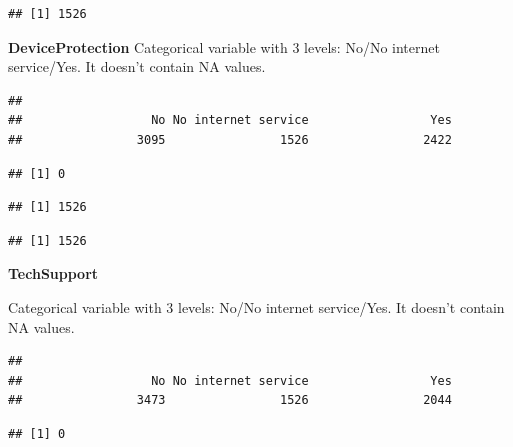 \documentclass[
  twoside]{article}
\newenvironment{Shaded}{\begin{snugshade}}{\end{snugshade}}
\newcommand{\CommentTok}[1]{\textcolor[rgb]{0.56,0.35,0.01}{\textit{#1}}}
\newcommand{\FunctionTok}[1]{\textcolor[rgb]{0.00,0.00,0.00}{#1}}
\newcommand{\NormalTok}[1]{#1}
\newcommand{\SpecialCharTok}[1]{\textcolor[rgb]{0.00,0.00,0.00}{#1}}
\newcommand{\StringTok}[1]{\textcolor[rgb]{0.31,0.60,0.02}{#1}}
\begin{document}
\begin{verbatim}
## [1] 1526
\end{verbatim}

\textbf{DeviceProtection} Categorical variable with 3 levels: No/No
internet service/Yes. It doesn't contain NA values.

\begin{verbatim}
## 
##                  No No internet service                 Yes 
##                3095                1526                2422
\end{verbatim}

\begin{verbatim}
## [1] 0
\end{verbatim}

\begin{Shaded}
\end{Shaded}

\begin{verbatim}
## [1] 1526
\end{verbatim}

\begin{Shaded}
\end{Shaded}

\begin{verbatim}
## [1] 1526
\end{verbatim}

\textbf{TechSupport}

Categorical variable with 3 levels: No/No internet service/Yes. It
doesn't contain NA values.

\begin{verbatim}
## 
##                  No No internet service                 Yes 
##                3473                1526                2044
\end{verbatim}

\begin{verbatim}
## [1] 0
\end{verbatim}
\end{document}
